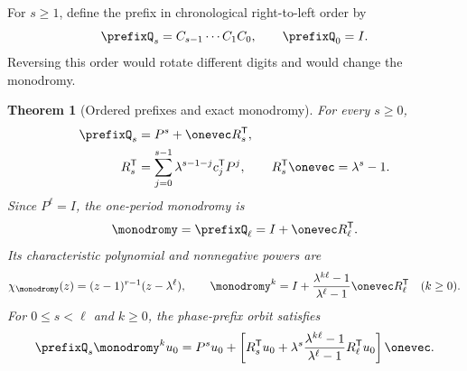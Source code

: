\documentclass[11pt,letterpaper]{article}
\newtheorem{theorem}{Theorem}[section]
\theoremstyle{definition}
\theoremstyle{remark}
\numberwithin{equation}{section}
\begin{document}
For \(s\geq1\), define the prefix in chronological right-to-left order by
\begin{equation}
 \prefixQ_s=C_{s-1}\cdots C_1C_0,
 \qquad \prefixQ_0=I.
 \label{eq:prefix-definition}
\end{equation}
Reversing this order would rotate different digits and would change the
monodromy.

\begin{theorem}[Ordered prefixes and exact monodromy]
\label{thm:ordered-monodromy}
For every \(s\geq0\),
\begin{equation}
 \begin{aligned}
 \prefixQ_s&=P^s+\onevec R_s^{\mathsf T},\\
 R_s^{\mathsf T}
  &=\sum_{j=0}^{s-1}\lambda^{s-1-j}c_j^{\mathsf T}P^j,
 \qquad
 R_s^{\mathsf T}\onevec=\lambda^s-1.
 \end{aligned}
 \label{eq:prefix-rank-one}
\end{equation}
Since \(P^\ell=I\), the one-period monodromy is
\begin{equation}
 \monodromy=\prefixQ_\ell
   =I+\onevec R_\ell^{\mathsf T}.
 \label{eq:monodromy}
\end{equation}
Its characteristic polynomial and nonnegative powers are
\begin{equation}
 \chi_{\monodromy}(z)
   =(z-1)^{r-1}(z-\lambda^\ell),
 \qquad
 \monodromy^k=I+
 \frac{\lambda^{k\ell}-1}{\lambda^\ell-1}
 \onevec R_\ell^{\mathsf T}
 \quad(k\geq0).
 \label{eq:monodromy-spectrum}
\end{equation}
For \(0\leq s<\ell\) and \(k\geq0\), the phase-prefix orbit satisfies
\begin{equation}
 \prefixQ_s\monodromy^ku_0=P^su_0+
 \left[
  R_s^{\mathsf T}u_0+
  \lambda^s\frac{\lambda^{k\ell}-1}{\lambda^\ell-1}
  R_\ell^{\mathsf T}u_0
 \right]\onevec.
 \label{eq:phase-prefix}
\end{equation}
\end{theorem}
\end{document}
